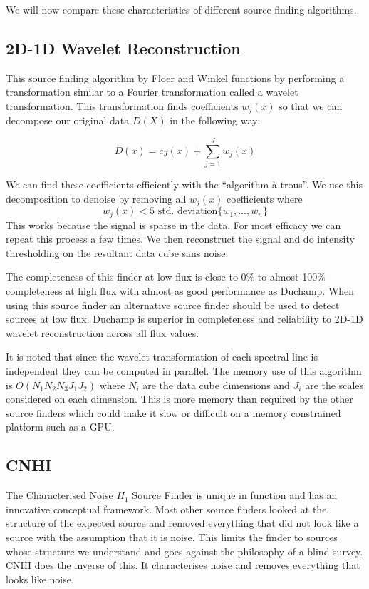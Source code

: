 \documentclass[prodmode,acmtecs]{acmsmall} \usepackage[ruled]{algorithm2e}
\begin{document}
    
    We will now compare these characteristics of different source finding algorithms.

 \cite{westerlund2012assessing}
 \cite{popping2012comparison}

    \subsection{2D-1D Wavelet Reconstruction}
    This source finding algorithm by Floer and Winkel functions by performing a transformation similar to a Fourier
    transformation called a wavelet transformation. This transformation finds coefficients $w_j(x)$
    so that we can decompose our original data $D(X)$ in the following way:

    $$D(x) = c_J(x) + \sum\limits_{j=1}^J w_j(x)$$
    
    We can find these coefficients efficiently with the ``algorithm \`{a} trous''. We
    use this decomposition to denoise by removing all $w_j(x)$ coefficients where
 $$w_j(x) < 5\text{ std. deviation}\{w_1, \ldots, w_n\}$$
    This works because the signal is sparse in the data. For most efficacy we can repeat this
    process a few times. We then reconstruct the signal and do intensity thresholding on the resultant
    data cube sans noise. 
    
    The completeness of this finder at low flux is close to 0\% 
    to almost 100\% completeness at high flux with almost as good performance as Duchamp. When using
    this source finder an alternative source finder should be used to detect sources at low flux. 
    Duchamp is superior in completeness and reliability to 2D-1D wavelet reconstruction across all flux values. \cite{popping2012comparison}
    
    It is noted that since the wavelet transformation of each spectral line is independent they
    can be computed in parallel. The memory use of this algorithm is $O(N_1 N_2 N_3 J_1 J_2)$ where $N_i$
    are the data cube dimensions and $J_i$ are the scales considered on each dimension. This is more
    memory than required by the other source finders which could make it slow or difficult on a memory
    constrained platform such as a GPU. 
    
    \cite{floer20122d}

     \subsection{CNHI}
     The Characterised Noise $H_1$ Source Finder is unique in function and has an innovative conceptual framework. Most other 
    source finders looked at the structure of the expected source and
     removed everything that did not look like a source with the assumption that it is noise.
     This limits the finder to sources whose structure we understand and goes against the 
     philosophy of a blind survey. 
     CNHI does the inverse of this. It characterises noise and removes everything that
     looks like noise. \cite{jurek2012characterised}
     
\end{document}
